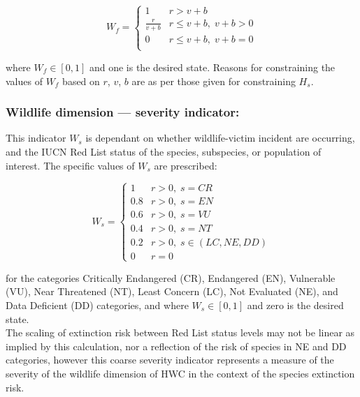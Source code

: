 \documentclass[fleqn,10pt]{olplainarticle}
\begin{document}
\begin{equation*}
    W_f = \begin{cases}
    1               & r > v + b \\
    \frac{r}{v + b} & r \le v + b,\; v + b > 0\\
    0               & r \le v + b,\; v + b = 0 \\
    \end{cases}
\end{equation*}

where $W_f \in [0,1]$ and one is the desired state. Reasons for constraining the values of $W_f$ based on $r$, $v$, $b$ are as per those given for constraining $H_s$.\\

\subsubsection*{Wildlife dimension --- severity indicator:}
This indicator $W_s$ is dependant on whether wildlife-victim incident are occurring, and the IUCN Red List status of the species, subspecies, or population of interest. The specific values of $W_s$ are prescribed:

\begin{equation*}
    W_s = \begin{cases}
    1   & r > 0, \; s = CR \\
    0.8 & r > 0, \; s = EN \\
    0.6 & r > 0, \; s = VU \\
    0.4 & r > 0, \; s = NT \\
    0.2 & r > 0, \; s \in (LC, NE, DD) \\
    0   & r = 0
    \end{cases}
\end{equation*}

for the categories Critically Endangered (CR), Endangered (EN), Vulnerable (VU), Near Threatened (NT), Least Concern (LC), Not Evaluated (NE), and Data Deficient (DD) categories, and where $W_s \in [0,1]$ and zero is the desired state.\\

The scaling of extinction risk between Red List status levels may not be linear as implied by this calculation, nor a reflection of the risk of species in NE and DD categories, however this coarse severity indicator represents a measure of the severity of the wildlife dimension of HWC in the context of the species extinction risk.\\
\end{document}
